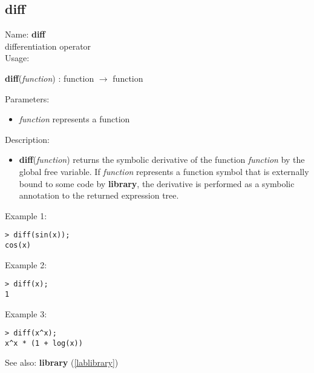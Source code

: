 \subsection{diff}
\label{labdiff}
\noindent Name: \textbf{diff}\\
differentiation operator\\

\noindent Usage: 
\begin{center}
\textbf{diff}(\emph{function}) : \textsf{function} $\rightarrow$ \textsf{function}\\
\end{center}
Parameters: 
\begin{itemize}
\item \emph{function} represents a function
\end{itemize}
\noindent Description: \begin{itemize}

\item \textbf{diff}(\emph{function}) returns the symbolic derivative of the function
   \emph{function} by the global free variable.
   If \emph{function} represents a function symbol that is externally bound
   to some code by \textbf{library}, the derivative is performed as a symbolic
   annotation to the returned expression tree.
\end{itemize}
\noindent Example 1: 
\begin{center}\begin{minipage}{15cm}\begin{Verbatim}[frame=single]
> diff(sin(x));
cos(x)
\end{Verbatim}
\end{minipage}\end{center}
\noindent Example 2: 
\begin{center}\begin{minipage}{15cm}\begin{Verbatim}[frame=single]
> diff(x);
1
\end{Verbatim}
\end{minipage}\end{center}
\noindent Example 3: 
\begin{center}\begin{minipage}{15cm}\begin{Verbatim}[frame=single]
> diff(x^x);
x^x * (1 + log(x))
\end{Verbatim}
\end{minipage}\end{center}
See also: \textbf{library} (\ref{lablibrary})
